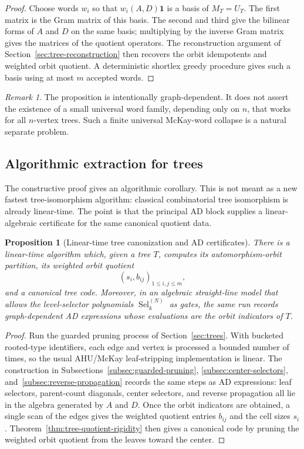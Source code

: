 \documentclass[a4paper,fleqn]{cas-sc}
\newtheorem{proposition}[theorem]{Proposition}
\theoremstyle{definition}
\theoremstyle{remark}
\newtheorem{remark}[theorem]{Remark}
\newcommand{\one}{\mathbf 1}
\newcommand{\Sel}{\operatorname{Sel}}
\begin{document}
\begin{proof}
Choose words $w_i$ so that $w_i(A,D)\one$ is a basis of $M_T=U_T$.  The first
matrix is the Gram matrix of this basis.  The second and third give the bilinear
forms of $A$ and $D$ on the same basis; multiplying by the inverse Gram matrix
gives the matrices of the quotient operators.  The reconstruction argument of Section~\ref{sec:tree-reconstruction} then recovers the orbit
idempotents and weighted orbit quotient.  A deterministic shortlex greedy
procedure gives such a basis using at most $m$ accepted words.
\end{proof}

\begin{remark}
The proposition is intentionally graph-dependent.  It does not assert the
existence of a small universal word family, depending only on $n$, that works for
all $n$-vertex trees.  Such a finite universal McKay-word collapse is a natural
separate problem.
\end{remark}


\subsection{Algorithmic extraction for trees}
\label{subsec:algorithmic-tree-extraction}

The constructive proof gives an algorithmic corollary.  This is not meant as a
new fastest tree-isomorphism algorithm: classical combinatorial tree isomorphism
is already linear-time.  The point is that the principal AD block supplies a
linear-algebraic certificate for the same canonical quotient data.

\begin{proposition}[Linear-time tree canonization and AD certificates]
\label{prop:linear-time-tree-canonization}
There is a linear-time algorithm which, given a tree $T$, computes its
automorphism-orbit partition, its weighted orbit quotient
\[
        (s_i,b_{ij})_{1\le i,j\le m},
\]
and a canonical tree code.  Moreover, in an algebraic straight-line model that
allows the level-selector polynomials $\Sel_k^{(N)}$ as gates, the same run
records graph-dependent AD expressions whose evaluations are the orbit
indicators of $T$.
\end{proposition}

\begin{proof}
Run the guarded pruning process of Section~\ref{sec:trees}.  With bucketed rooted-type
identifiers, each edge and vertex is processed a bounded number of times, so the
usual AHU/McKay leaf-stripping implementation is linear.  The construction in
Subsections~\ref{subsec:guarded-pruning}, \ref{subsec:center-selectors}, and~\ref{subsec:reverse-propagation}
records the same steps as AD expressions: leaf selectors, parent-count
diagonals, center selectors, and reverse propagation all lie in the algebra
generated by $A$ and $D$.  Once the orbit indicators are obtained, a single scan
of the edges gives the weighted quotient entries $b_{ij}$ and the cell sizes
$s_i$.  Theorem~\ref{thm:tree-quotient-rigidity} then gives a canonical code by pruning
the weighted orbit quotient from the leaves toward the center.
\end{proof}
\end{document}
